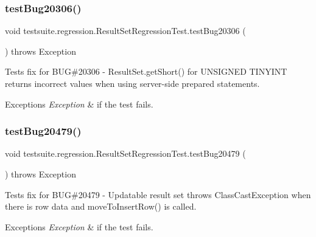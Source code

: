 \subsubsection{\texorpdfstring{test\+Bug20306()}{testBug20306()}}
{\footnotesize\ttfamily void testsuite.\+regression.\+Result\+Set\+Regression\+Test.\+test\+Bug20306 (\begin{DoxyParamCaption}{ }\end{DoxyParamCaption}) throws Exception}

Tests fix for B\+UG\#20306 -\/ Result\+Set.\+get\+Short() for U\+N\+S\+I\+G\+N\+ED T\+I\+N\+Y\+I\+NT returns incorrect values when using server-\/side prepared statements.


\begin{DoxyExceptions}{Exceptions}
{\em Exception} & if the test fails. \\
\hline
\end{DoxyExceptions}
\mbox{\label{classtestsuite_1_1regression_1_1_result_set_regression_test_ac51afa90e507daec20c3fe37a132b0de}} 
\subsubsection{\texorpdfstring{test\+Bug20479()}{testBug20479()}}
{\footnotesize\ttfamily void testsuite.\+regression.\+Result\+Set\+Regression\+Test.\+test\+Bug20479 (\begin{DoxyParamCaption}{ }\end{DoxyParamCaption}) throws Exception}

Tests fix for B\+UG\#20479 -\/ Updatable result set throws Class\+Cast\+Exception when there is row data and move\+To\+Insert\+Row() is called.


\begin{DoxyExceptions}{Exceptions}
{\em Exception} & if the test fails. \\
\hline
\end{DoxyExceptions}
\mbox{\label{classtestsuite_1_1regression_1_1_result_set_regression_test_a5e674e0b217a2731be3be70fa79f0007}} 
